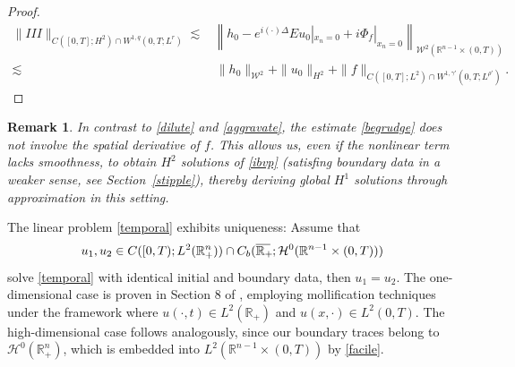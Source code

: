 \documentclass[preprint,compress,12pt]{elsarticle}
\newtheorem{remark}[theorem]{Remark}
\numberwithin{equation}{section}
\begin{document}
\begin{proof}
	\begin{equation*}
		\begin{aligned}
			\|III\|_{C([0,T];H^{2})\cap W^{1,q}(0,T;L^{r}) }\lesssim & \left\|h_{0}-e^{i(\cdot)\Delta}Eu_{0}|_{x_{n}=0}+i\Phi_{f}|_{x_{n}=0}\right\|_{\mathcal{W}^{2}(\mathbb{R}^{n-1}\times(0,T))}\\
			\lesssim & \, \|h_{0}\|_{\mathcal{W}^{2}}+\|u_{0}\|_{H^{2}}+\|f\|_{C([0,T];L^{2})\cap W^{1,\gamma'}(0,T;L^{\rho'})}.
		\end{aligned}
	\end{equation*}
\end{proof}
\begin{remark}
	In contrast to \eqref{dilute} and \eqref{aggravate}, the estimate \eqref{begrudge} does not involve the spatial derivative of $f$. This allows us, even if the nonlinear term lacks smoothness, to obtain $H^{2}$ solutions of \eqref{ibvp} (satisfing boundary data in a weaker sense, see Section~\ref{stipple}), thereby deriving global $H^{1}$ solutions through approximation in this setting.
\end{remark}
The linear problem \eqref{temporal} exhibits uniqueness: Assume that
\begin{equation*}
	u_{1}, u_{2}\in C([0,T);L^{2}(\mathbb{R}^{n}_{+}))\cap C_{b}(\overline{\mathbb{R}_{+}\mkern-4mu}\,;\mathcal{H}^{0}(\mathbb{R}^{n-1}\times(0,T)))
\end{equation*}
solve \eqref{temporal} with identical initial and boundary data, then $u_{1}=u_{2}$. The one-dimensional case is proven in Section 8 of \cite{chatter}, employing mollification techniques under the framework where $u(\cdot,t)\in L^{2}(\mathbb{R}_{+})$ and $u(x,\cdot)\in L^{2}(0,T)$. The high-dimensional case follows analogously, since our boundary traces belong to $\mathcal{H}^{0}(\mathbb{R}^{n}_{+})$, which is embedded into $L^{2}(\mathbb{R}^{n-1}\times(0,T))$ by \eqref{facile}.
\end{document}
